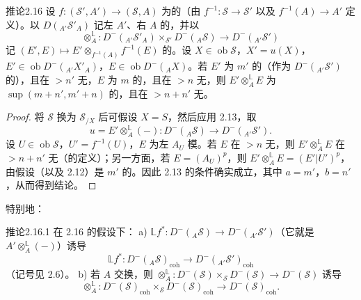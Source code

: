 \begin{SGAresult}{推论}{2.16}
设 $f:(\mathscr S',A')\to(\mathscr S,A)$ 为的（由 $f^{-1}:\mathscr S\to\mathscr S'$ 以及 $f^{-1}(A)\to A'$ 定义）。以 $D({}_{A'}\mathscr S'_A)$ 记左 $A'$、右 $A$ 的，并以
\[\mathbin{\mathop{\otimes}^{\mathbb L}_{A}}:D^-({}_{A'}\mathscr S'_A)\times_{\mathscr S'}D^-({}_A\mathscr S)\longrightarrow D^-({}_{A'}\mathscr S')\]
记 $(E',E)\mapsto E'\otimes_{f^{-1}(A)}f^{-1}(E)$ 的。设 $X\in\operatorname{ob}\mathscr S$，$X'=u(X)$，$E'\in\operatorname{ob}D^-({}_{A'}X'_A)$，$E\in\operatorname{ob}D^-({}_AX)$。若 $E'$ 为 $m'$ 的（作为 $D^-({}_{A'}\mathscr S')$ 的），且在 $>n'$ 无，$E$ 为 $m$ 的，且在 $>n$ 无，则 $E'\otimes_A^{\mathbb L}E$ 为 $\sup(m+n',m'+n)$ 的，且在 $>n+n'$ 无。
\end{SGAresult}
\begin{proof}
将 $\mathscr S$ 换为 $\mathscr S_{/X}$ 后可假设 $X=S$，然后应用 2.13，取
\[u=E'\otimes_A^{\mathbb L}(-):D^-({}_A\mathscr S)\longrightarrow D^-({}_{A'}\mathscr S').\]
设 $U\in\operatorname{ob}\mathscr S$，$U'=f^{-1}(U)$，$E$ 为左 $A_U$ 模。若 $E$ 在 $>n$ 无，则 $E'\otimes_A^{\mathbb L}E$ 在 $>n+n'$ 无（的定义）；另一方面，若 $E=(A_U)^p$，则 $E'\otimes_A^{\mathbb L}E=(E'|U')^p$，由假设（以及 2.12）是 $m'$ 的。因此 2.13 的条件确实成立，其中 $a=m'$，$b=n'$，从而得到结论。
\end{proof}
特别地：
\begin{SGAresult}{推论}{2.16.1}
在 2.16 的假设下：
a)  $\mathbb Lf^*:D^-({}_A\mathscr S)\to D^-({}_{A'}\mathscr S')$（它就是 $A'\otimes_A^{\mathbb L}(-)$）诱导
\[\mathbb Lf^*:D^-({}_A\mathscr S)_{\mathrm{coh}}\longrightarrow D^-({}_{A'}\mathscr S')_{\mathrm{coh}}\]
（记号见 2.6）。
b) 若 $A$ 交换，则 $\otimes_A^{\mathbb L}:D^-(\mathscr S)\times_{\mathscr S}D^-(\mathscr S)\to D^-(\mathscr S)$ 诱导
\[\otimes_A^{\mathbb L}:D^-(\mathscr S)_{\mathrm{coh}}\times_{\mathscr S}D^-(\mathscr S)_{\mathrm{coh}}\longrightarrow D^-(\mathscr S)_{\mathrm{coh}}.\]
\end{SGAresult}
